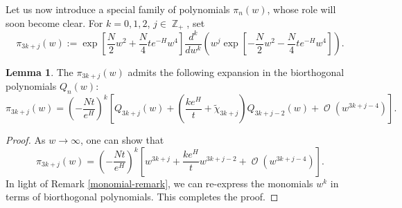 \documentclass[usenames,dvipsnames]{article}
\theoremstyle{definition}
\newtheorem{lemma}{Lemma}[section]
\DeclareMathOperator{\ZZ}{\mathbb{Z}}
\DeclareMathOperator{\OO}{\mathcal{O}}
\numberwithin{equation}{section}
\numberwithin{figure}{section}
\begin{document}
Let us now introduce a special family of polynomials $\pi_n(w)$, whose role will soon become clear. For $k=0,1,2$, $j\in \ZZ_{+}$, set
    \begin{equation}
        \pi_{3k+j}(w) := \exp\left[\frac{N}{2}w^2+\frac{N}{4}te^{-H}w^4\right]\frac{d^k}{dw^k}\left( w^j\exp\left[-\frac{N}{2}w^2-\frac{N}{4}te^{-H}w^4\right]\right).
    \end{equation}
\begin{lemma}\label{lemma:pi-expansion}
    The $\pi_{3k+j}(w)$ admits the following expansion in the biorthogonal polynomials $Q_n(w)$:
        \begin{equation*}
            \pi_{3k+j}(w) = \left(-\frac{Nt}{e^{H}}\right)^k\left[ Q_{3k+j}(w) + \left(\frac{ke^H}{t} + \tilde{\chi}_{3k+j}\right)Q_{3k+j-2}(w) + \OO(w^{3k+j-4})\right].
        \end{equation*}
\end{lemma}
\begin{proof}
    As $w\to \infty$, one can show that
        \begin{equation*}
            \pi_{3k+j}(w) = \left(-\frac{Nt}{e^{H}}\right)^k\left[w^{3k+j} + \frac{k e^{H}}{t}w^{3k+j-2} +  \OO(w^{3k+j-4})\right].
        \end{equation*}
    In light of Remark \ref{monomial-remark}, we can re-express the monomials $w^k$ in terms of biorthogonal polynomials. This completes the proof.
\end{proof}
\end{document}
